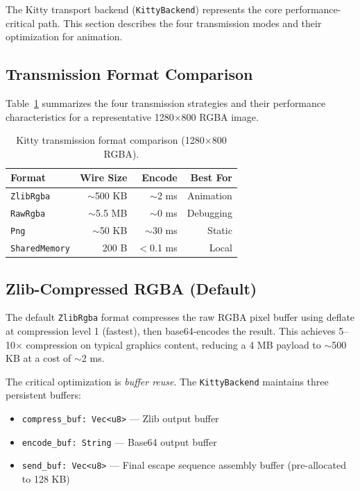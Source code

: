 \documentclass[11pt, a4paper, twocolumn]{article}
\begin{document}
The Kitty transport backend (\texttt{KittyBackend}) represents the core performance-critical path.
This section describes the four transmission modes and their optimization for animation.

\subsection{Transmission Format Comparison}

Table~\ref{tab:formats} summarizes the four transmission strategies and their performance characteristics for a representative 1280$\times$800 RGBA image.

\begin{table}[H]
\centering
\caption{Kitty transmission format comparison (1280$\times$800 RGBA).}
\label{tab:formats}
\small
\begin{tabular}{@{}lrrr@{}}
\toprule
\textbf{Format} & \textbf{Wire Size} & \textbf{Encode} & \textbf{Best For} \\
\midrule
\texttt{ZlibRgba} & $\sim$500 KB & $\sim$2 ms & Animation \\
\texttt{RawRgba} & $\sim$5.5 MB & $\sim$0 ms & Debugging \\
\texttt{Png} & $\sim$50 KB & $\sim$30 ms & Static \\
\texttt{SharedMemory} & 200 B & $<$0.1 ms & Local \\
\bottomrule
\end{tabular}
\end{table}

\subsection{Zlib-Compressed RGBA (Default)}

The default \texttt{ZlibRgba} format compresses the raw RGBA pixel buffer using deflate at compression level 1 (fastest), then base64-encodes the result.
This achieves 5--10$\times$ compression on typical graphics content, reducing a 4 MB payload to $\sim$500 KB at a cost of $\sim$2 ms.

The critical optimization is \emph{buffer reuse}.
The \texttt{KittyBackend} maintains three persistent buffers:

\begin{itemize}[leftmargin=1.2em, itemsep=0.1em]
    \item \texttt{compress\_buf: Vec<u8>} --- Zlib output buffer
    \item \texttt{encode\_buf: String} --- Base64 output buffer
    \item \texttt{send\_buf: Vec<u8>} --- Final escape sequence assembly buffer (pre-allocated to 128 KB)
\end{itemize}
\end{document}
